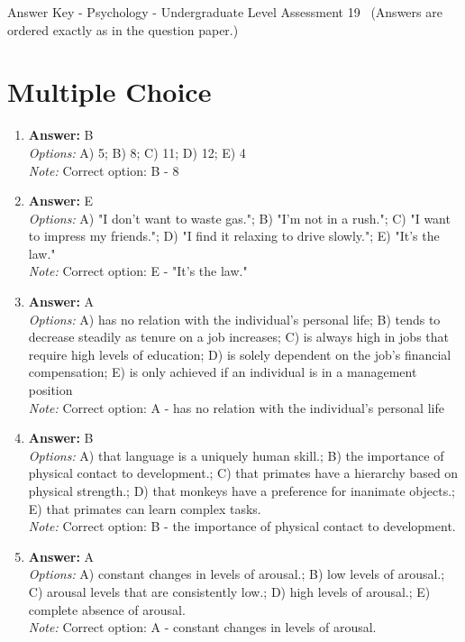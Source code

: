 \documentclass[12pt]{article}
\begin{document}
\begin{center}
Answer Key - Psychology - Undergraduate Level Assessment 19 \
\small (Answers are ordered exactly as in the question paper.)
\end{center}

\section*{Multiple Choice}
\begin{enumerate}[label=\arabic*.]
\item \textbf{Answer:} B
\\ \textit{Options:} A) 5; B) 8; C) 11; D) 12; E) 4
\\ \textit{Note:} Correct option: B - 8
\item \textbf{Answer:} E
\\ \textit{Options:} A) "I don't want to waste gas."; B) "I'm not in a rush."; C) "I want to impress my friends."; D) "I find it relaxing to drive slowly."; E) "It's the law."
\\ \textit{Note:} Correct option: E - "It's the law."
\item \textbf{Answer:} A
\\ \textit{Options:} A) has no relation with the individual's personal life; B) tends to decrease steadily as tenure on a job increases; C) is always high in jobs that require high levels of education; D) is solely dependent on the job's financial compensation; E) is only achieved if an individual is in a management position
\\ \textit{Note:} Correct option: A - has no relation with the individual's personal life
\item \textbf{Answer:} B
\\ \textit{Options:} A) that language is a uniquely human skill.; B) the importance of physical contact to development.; C) that primates have a hierarchy based on physical strength.; D) that monkeys have a preference for inanimate objects.; E) that primates can learn complex tasks.
\\ \textit{Note:} Correct option: B - the importance of physical contact to development.
\item \textbf{Answer:} A
\\ \textit{Options:} A) constant changes in levels of arousal.; B) low levels of arousal.; C) arousal levels that are consistently low.; D) high levels of arousal.; E) complete absence of arousal.
\\ \textit{Note:} Correct option: A - constant changes in levels of arousal.
\end{enumerate}
\end{document}
